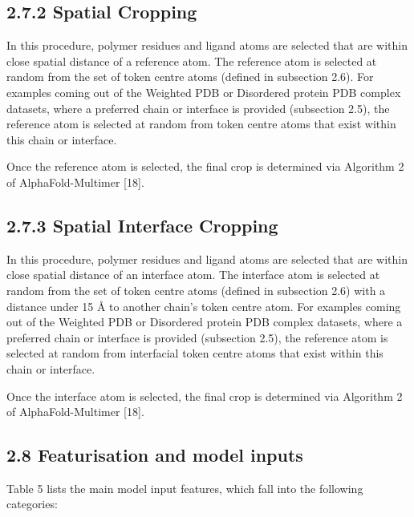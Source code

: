 \documentclass[10pt]{article}
\begin{document}
\subsection*{2.7.2 Spatial Cropping}
In this procedure, polymer residues and ligand atoms are selected that are within close spatial distance of a reference atom. The reference atom is selected at random from the set of token centre atoms (defined in subsection 2.6). For examples coming out of the Weighted PDB or Disordered protein PDB complex datasets, where a preferred chain or interface is provided (subsection 2.5), the reference atom is selected at random from token centre atoms that exist within this chain or interface.

Once the reference atom is selected, the final crop is determined via Algorithm 2 of AlphaFold-Multimer [18].

\subsection*{2.7.3 Spatial Interface Cropping}
In this procedure, polymer residues and ligand atoms are selected that are within close spatial distance of an interface atom. The interface atom is selected at random from the set of token centre atoms (defined in subsection 2.6) with a distance under 15 Å to another chain's token centre atom. For examples coming out of the Weighted PDB or Disordered protein PDB complex datasets, where a preferred chain or interface is provided (subsection 2.5), the reference atom is selected at random from interfacial token centre atoms that exist within this chain or interface.

Once the interface atom is selected, the final crop is determined via Algorithm 2 of AlphaFold-Multimer [18].

\subsection*{2.8 Featurisation and model inputs}
Table 5 lists the main model input features, which fall into the following categories:
\end{document}
